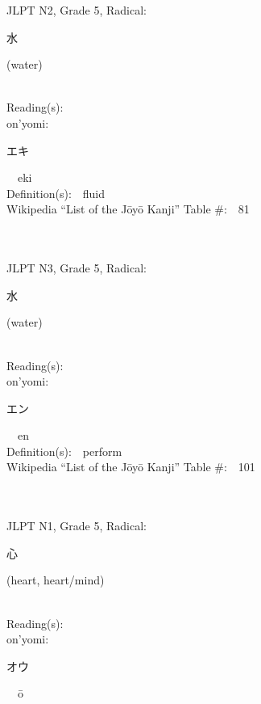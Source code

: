 \begin{multicols}{2}
{JLPT N2, Grade 5, Radical:\ \ {\begin{CJK}{UTF8}{min} 水 \end{CJK}} (water) } \\
Reading(s):\ \ \\
{\hspace*{1em}}on'yomi:\ \ \\
{\hspace*{2em}}{\begin{CJK}{UTF8}{min} エキ \end{CJK}}\ \ eki\ \ \\
Definition(s):\ \ fluid \\
Wikipedia ``List of the J\=oy\=o Kanji'' Table \#:\ \ 81 \\
\ \ \\
{\fontsize{34pt}{40pt}  }\ \ \\  %
{JLPT N3, Grade 5, Radical:\ \ {\begin{CJK}{UTF8}{min} 水 \end{CJK}} (water) } \\
Reading(s):\ \ \\
{\hspace*{1em}}on'yomi:\ \ \\
{\hspace*{2em}}{\begin{CJK}{UTF8}{min} エン \end{CJK}}\ \ en\ \ \\
Definition(s):\ \ perform \\
Wikipedia ``List of the J\=oy\=o Kanji'' Table \#:\ \ 101 \\
\ \ \\
{\fontsize{34pt}{40pt}  }\ \ \\  %
{JLPT N1, Grade 5, Radical:\ \ {\begin{CJK}{UTF8}{min} 心 \end{CJK}} (heart, heart/mind) } \\
Reading(s):\ \ \\
{\hspace*{1em}}on'yomi:\ \ \\
{\hspace*{2em}}{\begin{CJK}{UTF8}{min} オウ \end{CJK}}\ \ \=o\ \ \\

\end{multicols}
